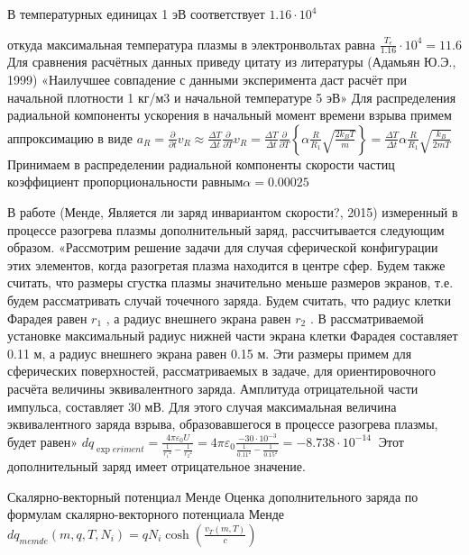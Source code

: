 ﻿\documentclass{article}
\begin{document}
В температурных единицах 1 эВ соответствует ${1.16}\cdot{{10}^{4}}\ $

откуда максимальная температура плазмы в электронвольтах равна $\frac{{{T}_{e}}}{1.16}\cdot{{10}^{4}}=11.6$ 
Для сравнения расчётных данных приведу цитату из литературы (Адамьян Ю.Э., 1999) «Наилучшее совпадение с данными эксперимента даст расчёт при начальной плотности 1 кг/м3 и начальной температуре 5 эВ»
Для распределения радиальной компоненты ускорения в начальный момент времени взрыва примем аппроксимацию в виде
${{a}_{R}}=\frac{\partial }{\partial t}{{v}_{R}}\approx \frac{\Delta T}{\Delta t}\frac{\partial }{\partial T}{{v}_{R}}=\frac{\Delta T}{\Delta t}\frac{\partial }{\partial T}\left\{ \alpha \frac{R}{{{R}_{1}}}\sqrt{\frac{2{{k}_{B}}T}{m}} \right\}=\frac{\Delta T}{\Delta t}\alpha \frac{R}{{{R}_{1}}}\sqrt{\frac{{{k}_{B}}}{2mT}}$ 
Принимаем в распределении радиальной компоненты скорости частиц коэффициент пропорциональности равным$\alpha =0.00025$ 






В работе (Менде, Является ли заряд инвариантом скорости?, 2015) измеренный в процессе разогрева плазмы дополнительный заряд, рассчитывается следующим образом. «Рассмотрим решение задачи для случая сферической конфигурации этих элементов, когда разогретая плазма находится в центре сфер. Будем также считать, что размеры сгустка плазмы значительно меньше размеров экранов, т.е. будем рассматривать случай точечного заряда. Будем считать, что радиус клетки Фарадея равен ${{r}_{1}}$ , а радиус внешнего экрана равен ${{r}_{2}}$ . В рассматриваемой установке максимальный радиус нижней части экрана клетки Фарадея составляет 0.11 м, а радиус внешнего экрана равен 0.15 м. Эти размеры примем для сферических поверхностей, рассматриваемых в задаче, для ориентировочного расчёта величины эквивалентного заряда. Амплитуда отрицательной части импульса, составляет 30 мВ. Для этого случая максимальная величина эквивалентного заряда взрыва, образовавшегося в процессе разогрева плазмы, будет равен» 
$d{{q}_{\exp eriment}}=\frac{4\pi {{\varepsilon }_{0}}U}{\frac{1}{{{r}_{1}}^{2}}-\frac{1}{{{r}_{2}}^{2}}}=4\pi {{\varepsilon }_{0}}\frac{-30\cdot {{10}^{-3}}}{\frac{1}{{{0.11}^{2}}}-\frac{1}{{{0.15}^{2}}}}=-8.738\cdot {{10}^{-14}}\ $ 
Этот дополнительный заряд имеет отрицательное значение.


Скалярно-векторный потенциал Менде
Оценка дополнительного заряда по формулам скалярно-векторного потенциала Менде
$d{{q}_{memde}}(m,q,T,{{N}_{i}})=q{{N}_{i}}\cosh \left( \frac{{{v}_{T}}\left( m,T \right)}{c} \right)$
\end{document}
